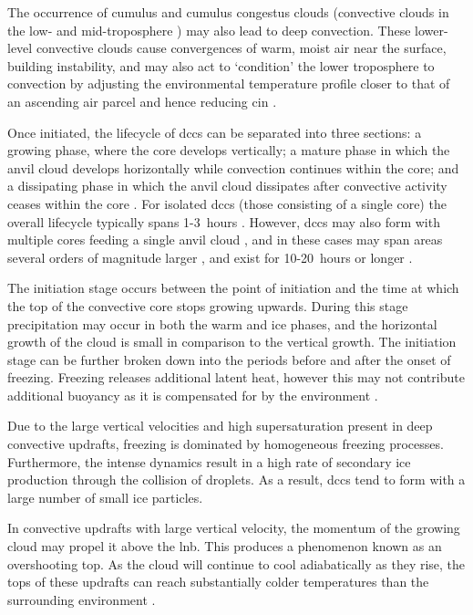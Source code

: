 The occurrence of cumulus and cumulus congestus clouds (convective clouds in the low- and mid-troposphere \citep{johnson_trimodal_1999}) may also lead to deep convection. 
These lower-level convective clouds cause convergences of warm, moist air near the surface, building instability, and may also act to `condition’ the lower troposphere to convection by adjusting the environmental temperature profile closer to that of an ascending air parcel and hence reducing \acrshort{cin} \citep{masunaga_mechanism_2014, schulz_observing_2018}.

Once initiated, the lifecycle of \acrshort{dcc}s can be separated into three sections: a growing phase, where the core develops vertically; a mature phase in which the anvil cloud develops horizontally while convection continues within the core; and a dissipating phase in which the anvil cloud dissipates after convective activity ceases within the core \citep{wall_life_2018}.
For isolated \acrshort{dcc}s (those consisting of a single core) the overall lifecycle typically spans 1-3~hours \citep{chen_diurnal_1997}.
However, \acrshort{dcc}s may also form with multiple cores feeding a single anvil cloud \citep{roca_simple_2017}, and in these cases may span areas several orders of magnitude larger \citep{houze_mesoscale_2004}, and exist for 10-20~hours or longer \citep{chen_diurnal_1997}.

The initiation stage occurs between the point of initiation and the time at which the top of the convective core stops growing upwards.
During this stage precipitation may occur in both the warm and ice phases, and the horizontal growth of the cloud is small in comparison to the vertical growth.
The initiation stage can be further broken down into the periods before and after the onset of freezing.
Freezing releases additional latent heat, however this may not contribute additional buoyancy as it is compensated for by the environment \citep{seeley_tropical_2016}.

Due to the large vertical velocities and high supersaturation present in deep convective updrafts, freezing is dominated by homogeneous freezing processes.
Furthermore, the intense dynamics result in a high rate of secondary ice production through the collision of droplets.
As a result, \acrshort{dcc}s tend to form with a large number of small ice particles.

In convective updrafts with large vertical velocity, the momentum of the growing cloud may propel it above the \acrshort{lnb}.
This produces a phenomenon known as an overshooting top.
As the cloud will continue to cool adiabatically as they rise, the tops of these updrafts can reach substantially colder temperatures than the surrounding environment \citep{proud_recordlow_2021}.

